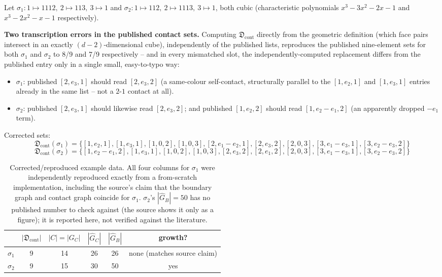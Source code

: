 \documentclass[11pt]{article}
\begin{document}
Let $\sigma_1: 1\mapsto 1112,\ 2\mapsto 113,\ 3\mapsto 1$ and
$\sigma_2: 1\mapsto 112,\ 2\mapsto 1113,\ 3\mapsto 1$, both cubic
(characteristic polynomials $x^3-3x^2-2x-1$ and $x^3-2x^2-x-1$ respectively).

\begin{correction}
\textbf{Two transcription errors in the published contact sets.} Computing
$\mathfrak{D}_{\mathrm{cont}}$ directly from the geometric definition (which
face pairs intersect in an exactly $(d-2)$-dimensional cube), independently of
the published lists, reproduces the published nine-element sets for both
$\sigma_1$ and $\sigma_2$ to 8/9 and 7/9 respectively -- and in every
mismatched slot, the independently-computed replacement differs from the
published entry only in a single small, easy-to-typo way:
\begin{itemize}[leftmargin=1.5em]
\item $\sigma_1$: published $[2,e_3,1]$ should read $[2,e_3,2]$ (a same-colour
self-contact, structurally parallel to the $[1,e_2,1]$ and $[1,e_3,1]$ entries
already in the same list -- not a $2$-$1$ contact at all).
\item $\sigma_2$: published $[2,e_3,1]$ should likewise read $[2,e_3,2]$; and
published $[1,e_2,2]$ should read $[1,e_2-e_1,2]$ (an apparently dropped
$-e_1$ term).
\end{itemize}
Corrected sets:
$$\mathfrak{D}_{\mathrm{cont}}(\sigma_1)=\{[1,e_2,1],[1,e_3,1],[1,0,2],[1,0,3],[2,e_1{-}e_2,1],[2,e_3,2],[2,0,3],[3,e_1{-}e_3,1],[3,e_2{-}e_3,2]\}$$
$$\mathfrak{D}_{\mathrm{cont}}(\sigma_2)=\{[1,e_2{-}e_1,2],[1,e_3,1],[1,0,2],[1,0,3],[2,e_3,2],[2,e_1,2],[2,0,3],[3,e_1{-}e_3,1],[3,e_2{-}e_3,2]\}$$
\end{correction}

\begin{table}[h]
\centering
\begin{tabular}{@{}lccccc@{}}
\toprule
& $|\mathfrak{D}_{\mathrm{cont}}|$ & $|C|=|G_C|$ & $|\hat G_C|$ & $|\hat G_B|$ & growth? \\
\midrule
$\sigma_1$ & 9 & 14 & 26 & 26 & none (matches source claim) \\
$\sigma_2$ & 9 & 15 & 30 & 50 & yes \\
\bottomrule
\end{tabular}
\caption{Corrected/reproduced example data. All four columns for $\sigma_1$
were independently reproduced exactly from a from-scratch implementation,
including the source's claim that the boundary graph and contact graph
coincide for $\sigma_1$. $\sigma_2$'s $|\hat G_B|=50$ has no published number
to check against (the source shows it only as a figure); it is reported here,
not verified against the literature.}
\end{table}
\end{document}

